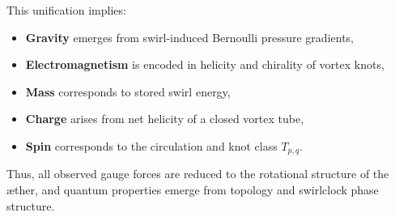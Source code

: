 This unification implies:
\begin{itemize}
    \item \textbf{Gravity} emerges from swirl-induced Bernoulli pressure gradients,
    \item \textbf{Electromagnetism} is encoded in helicity and chirality of vortex knots,
    \item \textbf{Mass} corresponds to stored swirl energy,
    \item \textbf{Charge} arises from net helicity of a closed vortex tube,
    \item \textbf{Spin} corresponds to the circulation and knot class \( T_{p,q} \).
\end{itemize}

Thus, all observed gauge forces are reduced to the rotational structure of the æther, and quantum properties emerge from topology and swirlclock phase structure.

